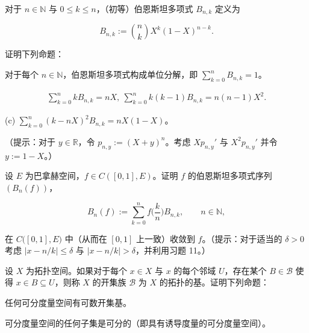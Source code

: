 \begin{exercises}
\begin{items}
\end{items}

\item

对于  $n \in \mathbb{N}$ 与  $0 \leq k \leq n$，（初等）伯恩斯坦多项式  $B_{n,k}$ 定义为

\[
B_{n,k}:=\binom{n}{k}X^{k}(1-X)^{n-k}.
\]

证明下列命题：

\begin{items}
\item

对于每个  $n \in \mathbb{N}$，伯恩斯坦多项式构成单位分解，即  $\sum_{k=0}^{n} B_{n,k} = 1$。

\begin{equation*}
\begin{array}{r}{\sum_{k=0}^{n}k B_{n,k}=n X,~\sum_{k=0}^{n}k(k-1)B_{n,k}=n(n-1)X^{2}.}\end{array}
\end{equation*}
\end{items}

(c)  $\sum_{k=0}^{n}(k-nX)^{2}B_{n,k}=nX(1-X)$。

（提示：对于  $y \in \mathbb{R}$，令  $p_{n,y} := (X + y)^n$。考虑  $X p_{n,y}'$ 与  $X^2 p_{n,y}'$ 并令  $y := 1 - X$。）

\item

设 $E$ 为巴拿赫空间，$f \in C([0,1],E)$。证明 $f$ 的伯恩斯坦多项式序列 $(B_n(f))$，

\[
B_{n}(f):=\sum_{k=0}^{n}f\Big(\frac{k}{n}\Big)B_{n,k},\qquad n\in\mathbb{N},
\]

在  $C\big([0,1],E\big)$ 中（从而在  $[0,1]$ 上一致）收敛到  $f$。（提示：对于适当的  $\delta > 0$ 考虑  $|x - n/k| \leq \delta$ 与  $|x - n/k| > \delta$，并利用习题 11。）

\item

设 $X$ 为拓扑空间。如果对于每个 $x \in X$ 与 $x$ 的每个邻域 $U$，存在某个 $B \in \mathcal{B}$ 使得 $x \in B \subseteq U$，则称 $X$ 的开集族 $\mathcal{B}$ 为 $X$ 的拓扑的基。证明下列命题：

\begin{items}
\item

任何可分度量空间有可数开集基。

\item

可分度量空间的任何子集是可分的（即具有诱导度量的可分度量空间）。


\end{items}
\end{exercises}
